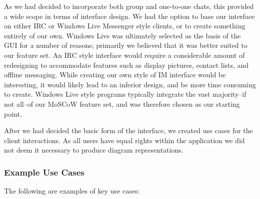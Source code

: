 As we had decided to incorporate both group and one-to-one chats, this provided a wide scope in terms of interface design. We had the option to base our interface on either IRC or Windows Live Messenger style clients, or to create something entirely of our own. Windows Live was ultimately selected as the basis of the GUI for a number of reasons; primarily we believed that it was better suited to our feature set. An IRC style interface would require a considerable amount of redesigning to accommodate features such as display pictures, contact lists, and offline messaging. While creating our own style of IM interface would be interesting, it would likely lead to an inferior design, and be more time consuming to create. Windows Live style programs typically integrate the vast majority--if not all--of our MoSCoW feature set, and was therefore chosen as our starting point.
 
After we had decided the basic form of the interface, we created use cases for the client interactions. As all users have equal rights within the application we did not deem it necessary to produce diagram representations.

\subsubsection{Example Use Cases}

The following are examples of key use cases:


